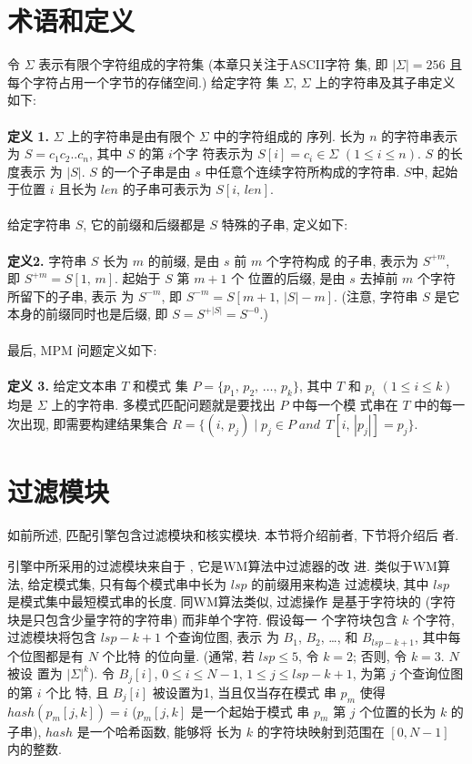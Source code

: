 \documentclass{ws-ijprai}
\begin{document}
\section{术语和定义}
\label{sec:notations}

令 $\Sigma$ 表示有限个字符组成的字符集 (本章只关注于ASCII字符
集, 即 $|\Sigma| = 256$ 且每个字符占用一个字节的存储空间.)  给定字符
集 $\Sigma$, $\Sigma$ 上的字符串及其子串定义如下:\\
\\
\textbf{定义 1.}  $\Sigma$ 上的字符串是由有限个 $\Sigma$ 中的字符组成的
序列. 长为 $n$ 的字符串表示为 $S = c_1c_2..c_n$, 其中 $S$ 的第 $i$个字
符表示为 $S[i] = c_i \in \Sigma$ $(1 \leq i \leq n)$.  $S$ 的长度表示
为 $|S|$. $S$ 的一个子串是由 $s$ 中任意个连续字符所构成的字符串.  $S$中,
起始于位置 $i$ 且长为 $len$ 的子串可表示为 $S[i,\,len]$.\\
\\
给定字符串 $S$, 它的前缀和后缀都是 $S$ 特殊的子串, 定义如下:\\
\\
\textbf{定义2.} 字符串 $S$ 长为 $m$ 的前缀, 是由 $s$ 前 $m$ 个字符构成
的子串, 表示为 $S^{+m}$, 即 $S^{+m}=S[1,\,m]$.  起始于 $S$ 第 $m+1$ 个
位置的后缀, 是由 $s$ 去掉前 $m$ 个字符所留下的子串, 表示
为 $S^{-m}$, 即 $S^{-m} = S[m+1,\,|S|-m]$. (注意, 字符串 $S$
是它本身的前缀同时也是后缀, 即 $S=S^{+|S|}=S^{-0}$.)\\
\\
最后, MPM 问题定义如下: \\
\\
\textbf{定义 3.} 给定文本串 $T$ 和模式
集 $P=\{p_1,\,p_2,\,\dots,\,p_k\}$, 其中 $T$ 和 $p_i$ $(1 \leq i \leq
k)$ 均是 $\Sigma$ 上的字符串. 多模式匹配问题就是要找出 $P$ 中每一个模
式串在 $T$ 中的每一次出现, 即需要构建结果集合
$R = \{(i,\, p_j)\;|\; p_j \in P\; and\,\; T[i,\,|p_j|]=p_j\}$.


\section{过滤模块}
\label{sec:filter}

如前所述, 匹配引擎包含过滤模块和核实模块. 本节将介绍前者, 下节将介绍后
者.

引擎中所采用的过滤模块来自于 \cite{Lee2013}, 它是WM算法中过滤器的改
进. 类似于WM算法, 给定模式集, 只有每个模式串中长为 $lsp$ 的前缀用来构造
过滤模块, 其中 $lsp$ 是模式集中最短模式串的长度. 同WM算法类似, 过滤操作
是基于字符块的 (字符块是只包含少量字符的字符串) 而非单个字符. 假设每一
个字符块包含 $k$ 个字符, 过滤模块将包含 $lsp-k+1$ 个查询位图, 表示
为 $B_1$, $B_2$, \dots, 和 $B_{lsp-k+1}$, 其中每个位图都是有 $N$ 个比特
的位向量.  (通常, 若 $lsp \leq 5$, 令 $k = 2$; 否则, 令 $k=3$. $N$ 被设
置为 $|\Sigma|^k$). 令 $B_j[i]$, $0 \leq i \leq N - 1$,
$1 \leq j \leq lsp-k+1$, 为第 $j$ 个查询位图的第 $i$ 个比
特, 且 $B_j[i]$ 被设置为1, 当且仅当存在模式
串 $p_m$ 使得 $hash(p_m[j,k]) = i$ ($p_m[j,k]$ 是一个起始于模式
串 $p_m$ 第 $j$ 个位置的长为 $k$ 的子串), $hash$ 是一个哈希函数, 能够将
长为 $k$ 的字符块映射到范围在 $[0, N-1]$ 内的整数.
\end{document}
